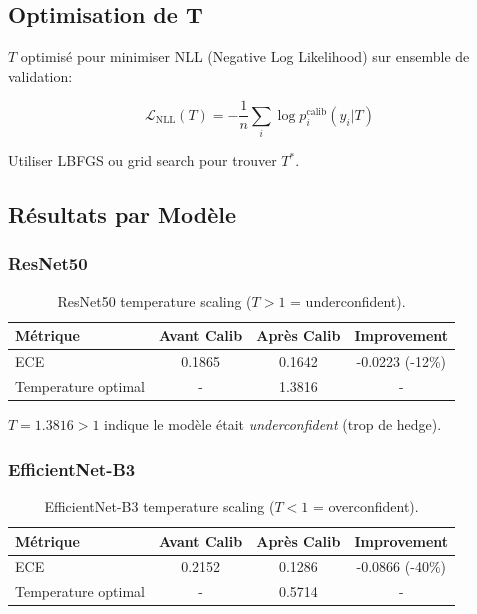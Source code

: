 \documentclass[12pt,a4paper,oneside]{report}
\begin{document}
\subsection{Optimisation de T}

$T$ optimisé pour minimiser NLL (Negative Log Likelihood) sur 
ensemble de validation:

\begin{equation}
\mathcal{L}_{\text{NLL}}(T) = -\frac{1}{n} \sum_i \log p_i^{\text{calib}}(y_i | T)
\label{eq:nll_loss}
\end{equation}

Utiliser LBFGS ou grid search pour trouver $T^*$.

\subsection{Résultats par Modèle}

\subsubsection{ResNet50}

\begin{table}[H]
\centering
\begin{tabular}{|l|c|c|c|}
\hline
Métrique & Avant Calib & Après Calib & Improvement \\
\hline
ECE & 0.1865 & 0.1642 & -0.0223 (-12\%) \\
Temperature optimal & - & 1.3816 & - \\
\hline
\end{tabular}
\caption{ResNet50 temperature scaling ($T > 1$ = underconfident).}
\label{tab:resnet_temp}
\end{table}

$T = 1.3816 > 1$ indique le modèle était \textit{underconfident} 
(trop de hedge).

\subsubsection{EfficientNet-B3}

\begin{table}[H]
\centering
\begin{tabular}{|l|c|c|c|}
\hline
Métrique & Avant Calib & Après Calib & Improvement \\
\hline
ECE & 0.2152 & 0.1286 & -0.0866 (-40\%) \\
Temperature optimal & - & 0.5714 & - \\
\hline
\end{tabular}
\caption{EfficientNet-B3 temperature scaling ($T < 1$ = overconfident).}
\label{tab:effnet_temp}
\end{table}
\end{document}
